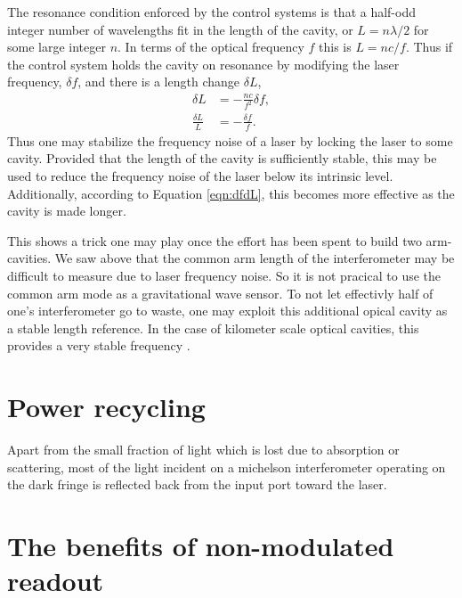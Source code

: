 The resonance condition enforced by the control systems is that a half-odd integer number of wavelengths fit in the length of the cavity, or $L=n\lambda/2$ for some large integer $n$. %
In terms of the optical frequency $f$ this is $L=nc/f$. %
Thus if the control system holds the cavity on resonance by modifying the laser frequency, $\delta f$, and there is a length change $\delta L$,
\begin{align}
\delta L &= -\frac{nc}{f^2}\delta f, \\
\frac{\delta L}{L} &= -\frac{\delta f}{f}.
\label{eqn:dfdL}
\end{align}
Thus one may stabilize the frequency noise of a laser by locking the laser to some cavity. %
Provided that the length of the cavity is sufficiently stable, this may be used to reduce the frequency noise of the laser below its intrinsic level. %
Additionally, according to Equation \ref{eqn:dfdL}, this becomes more effective as the cavity is made longer.

This shows a trick one may play once the effort has been spent to build two arm-cavities. %
We saw above that the common arm length of the interferometer may be difficult to measure due to laser frequency noise. %
So it is not pracical to use the common arm mode as a gravitational wave sensor. %
To not let effectivly half of one's interferometer go to waste, one may exploit this additional opical cavity as a stable length reference. %
In the case of kilometer scale optical cavities, this provides a very stable frequency .

\section{Power recycling}
Apart from the small fraction of light which is lost due to absorption or scattering, most of the light incident on a michelson interferometer operating on the dark fringe is reflected back from the input port toward the laser. %





\section{The benefits of non-modulated readout}


